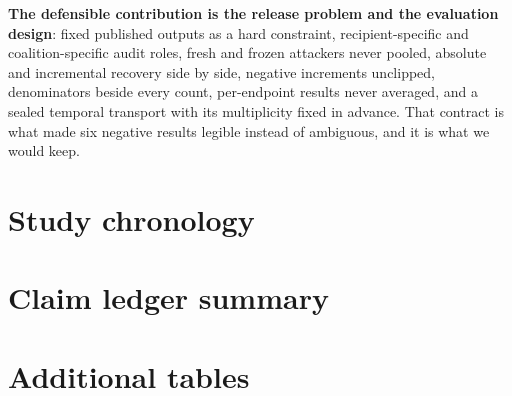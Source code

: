 \documentclass[conference]{IEEEtran}
\begin{document}
\textbf{The defensible contribution is the release problem and the evaluation design}: fixed published
outputs as a hard constraint, recipient-specific and coalition-specific audit roles, fresh and frozen
attackers never pooled, absolute and incremental recovery side by side, negative increments unclipped,
denominators beside every count, per-endpoint results never averaged, and a sealed temporal transport
with its multiplicity fixed in advance. That contract is what made six negative results legible instead
of ambiguous, and it is what we would keep.




\appendices

\section{Study chronology}
\label{app:chronology}
\begin{table}[h]
\centering\footnotesize

\caption{The completed studies, with evidence commits and what each is evidence for. Only the first is
confirmatory.}
\end{table}

\section{Claim ledger summary}
\label{app:claims}
\begin{table}[h]
\centering\scriptsize

\caption{Every load-bearing claim, its status, the measurement behind it, and what it does not establish.
The full traceable list is in the artifact.}
\end{table}

\section{Additional tables}
\label{app:tables}
\begin{table}[h]
\centering\footnotesize

\caption{External arms against $J$. \noteExternalVsJ}
\end{table}
\begin{table}[h]
\centering\footnotesize

\caption{The exact repair worked on the objective and did not work on the release. \noteRepairDiagnostic}
\end{table}
\begin{table}[h]
\centering\footnotesize

\caption{The utility-first study's tier ladder. Tiers 3 and 4 were never triggered.}
\end{table}
\end{document}
